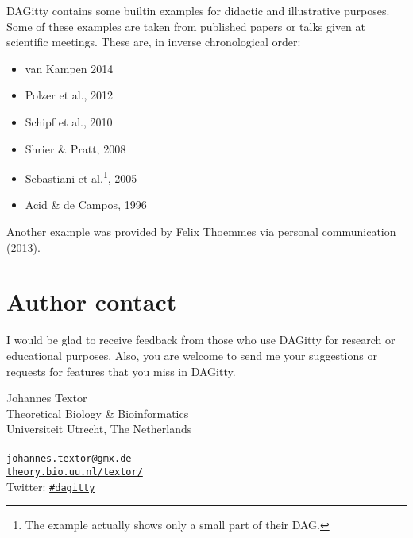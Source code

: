\documentclass[a4paper]{article} %
\newcommand{\pp}{{\sc DAG}itty\xspace}
\begin{document}
\pp contains some builtin examples for didactic and illustrative purposes. 
Some of these examples are taken from published papers or talks given at 
scientific meetings. These are, in inverse chronological order: 

\begin{itemize}
 \item van Kampen 2014 \cite{Kampen2014} 
 \item Polzer et al., 2012 \cite{Polzer2012}
 \item Schipf et al., 2010 \cite{Schipf2010}
 \item Shrier \& Pratt, 2008 \cite{ShrierP2008}
 \item Sebastiani et al.\footnote{The example actually shows only a small part of their DAG.}, 
    2005 \cite{Sebastiani2005}
 \item Acid \& de Campos, 1996 \cite{Acid1996}
\end{itemize}

Another example was provided by Felix Thoemmes 
via personal communication (2013).


\section{Author contact}

I would be glad to receive feedback from those 
who use \pp for research or educational purposes. 
Also, you are welcome to send me your 
suggestions or requests for features that 
you miss in \pp. 

\bigskip

\noindent
Johannes Textor \\
Theoretical Biology \& Bioinformatics \\
Universiteit Utrecht, The Netherlands \\
\\
\href{mailto:johannes.textor@gmx.de}{\tt johannes.textor@gmx.de} \\
\href{http://theory.bio.uu.nl/textor/}{\tt theory.bio.uu.nl/textor/} \\
Twitter: \href{https://twitter.com/hashtag/dagitty}{\tt \#dagitty}

\bigskip



\end{document}
